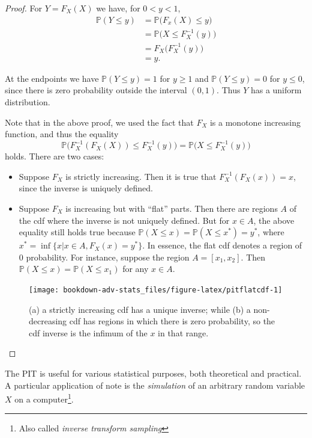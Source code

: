\documentclass[
]{book}
\newcommand{\bbP}{\mathbb{P}}
\theoremstyle{definition}
\theoremstyle{definition}
\theoremstyle{definition}
\theoremstyle{definition}
\theoremstyle{remark}
\begin{document}
\begin{proof}

For \(Y=F_X(X)\) we have, for \(0<y<1\),
\begin{align*}
\bbP(Y \leq y)
&= \bbP\big(F_x(X) \leq y\big) \\
&= \bbP\big(X \leq F^{-1}_X(y) \big) \\
&= F_X\big( F^{-1}_X(y) \big) \\
&= y.
\end{align*}

At the endpoints we have \(\bbP(Y \leq y) = 1\) for \(y\geq 1\) and \(\bbP(Y \leq y) = 0\) for \(y\leq 0\), since there is zero probability outside the interval \((0,1)\).
Thus \(Y\) has a uniform distribution.

Note that in the above proof, we used the fact that \(F_X\) is a monotone increasing function, and thus the equality
\[
\bbP\big(F^{-1}_X(F_X(X)) \leq F^{-1}_X(y) \big) = \bbP\big(X \leq F^{-1}_X(y) \big)
\]
holds. There are two cases:

\begin{itemize}
\item
  Suppose \(F_X\) is strictly increasing. Then it is true that \(F^{-1}_X(F_X(x))=x\), since the inverse is uniquely defined.
\item
  Suppose \(F_X\) is increasing but with ``flat'' parts. Then there are regions \(A\) of the cdf where the inverse is not uniquely defined. But for \(x\in A\), the above equality still holds true because \(\bbP(X\leq x) = \bbP(X \leq x^*) = y^*\), where \(x^* = \inf\{x | x\in A, F_X(x) = y^* \}\). In essence, the flat cdf denotes a region of 0 probability. For instance, suppose the region \(A=[x_1,x_2]\). Then \(\bbP(X\leq x) = \bbP(X \leq x_1)\) for any \(x \in A\).
\end{itemize}

\begin{figure}

{\centering \texttt{[image: bookdown-adv-stats\_files/figure-latex/pitflatcdf-1]} 

}

\caption{(a) a strictly increasing cdf has a unique inverse; while (b) a non-decreasing cdf has regions in which there is zero probability, so the cdf inverse is the infimum of the \(x\) in that range.}\label{fig:pitflatcdf}
\end{figure}

\end{proof}

The PIT is useful for various statistical purposes, both theoretical and practical.
A particular application of note is the \emph{simulation} of an arbitrary random variable \(X\) on a computer\footnote{Also called \emph{inverse transform sampling}}.
\end{document}
